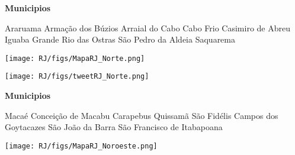 \documentclass[10pt]{article} %
\begin{document}
\begin{minipage}[t]{.30\linewidth}
\begin{mdframed}[style=sidebar,frametitle={}]
\textbf{Municipios}\begin{itemize}\ysquare Araruama 
\wsquare Armação dos Búzios 
\ysquare Arraial do Cabo 
\wsquare Cabo Frio 
\ysquare Casimiro de Abreu 
\wsquare Iguaba Grande 
\ysquare Rio das Ostras 
\wsquare São Pedro da Aldeia 
\wsquare Saquarema 
\end{itemize}\BackToContents\end{mdframed}\hfill\end{minipage}\newpage\begin{minipage}[t]{.66\linewidth}
\hypertarget{Nort}{}
\texttt{[image: RJ/figs/MapaRJ\_Norte.png]}\vspace{0.5cm}\begin{center}

\end{center}
\vspace{0.5cm}\begin{center}
\texttt{[image: RJ/figs/tweetRJ\_Norte.png]}\end{center}
\end{minipage}\hfill\begin{minipage}[t]{.30\linewidth}
\begin{mdframed}[style=sidebar,frametitle={}]
\textbf{Municipios}\begin{itemize}\osquare Macaé 
\wsquare Conceição de Macabu 
\wsquare Carapebus 
\ysquare Quissamã 
\wsquare São Fidélis 
\ysquare Campos dos Goytacazes 
\wsquare São João da Barra 
\wsquare São Francisco de Itabapoana 
\end{itemize}\BackToContents\end{mdframed}\hfill\end{minipage}\newpage\begin{minipage}[t]{.66\linewidth}
\hypertarget{Nrst}{}
\texttt{[image: RJ/figs/MapaRJ\_Noroeste.png]}\vspace{0.5cm}\begin{center}

\end{center}
\vspace{0.5cm}\begin{center}

\end{center}
\end{minipage}
\end{document}
